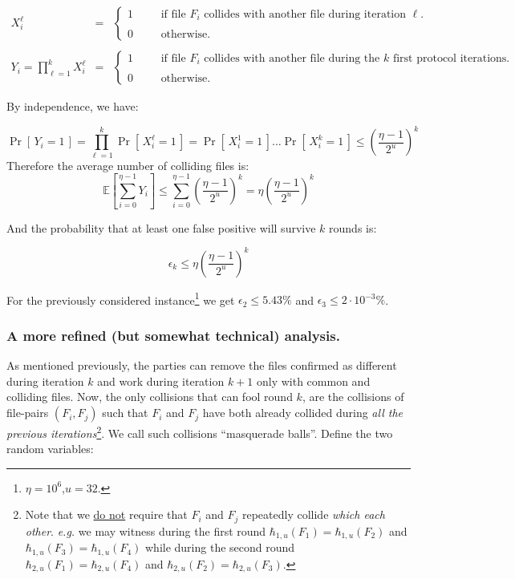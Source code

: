 \documentclass[11pt]{llncs}
\newcommand{\Prob}[1]{{\Pr\left[\,{#1}\,\right]}}
\newcommand{\EE}[1]{{\mathbb{E}\left[{#1}\right]}}
\begin{document}
$$
\begin{array}{rcl}
X^{\ell}_i & = &
\left\{
\begin{array}{lcl}
1 & ~~~~&  \mbox{if file $F_i$ collides with another file during iteration $\ell$.}\\
\\
0 & ~~~~&  \mbox{otherwise.}
\end{array}
\right.\\
\\
Y_i = \prod_{\ell=1}^k X^{\ell}_i & = &
\left\{
\begin{array}{lcl}
1 & ~~~~&  \mbox{if file $F_i$ collides with another file during the $k$ first protocol iterations.}\\
\\
0 & ~~~~&  \mbox{otherwise.}
\end{array}
\right.
\end{array}$$

By independence, we have:

 \[ \Prob{Y_i = 1} = \prod_{\ell=1}^k \Prob{X^{\ell}_i = 1} = \Prob{X^1_i = 1} \dots \Prob{X^k_i = 1} \le \left( \frac{\eta -1}{2^u} \right)^k \]
Therefore the average number of colliding files is:
\[
 \EE{\sum_{i=0}^{\eta-1} Y_i} \le \sum_{i=0}^{\eta-1} \left( \frac{\eta -1}{2^u} \right)^k =  \eta \left(\frac{\eta - 1}{2^u}\right)^k
\]

And the probability that at least one false positive will survive $k$ rounds is:

\[
\epsilon_k \le \eta \left(\frac{\eta - 1}{2^u}\right)^k
\]

For the previously considered instance\footnote{$\eta=10^6$,$u=32$.} we get $\epsilon_2 \le 5.43\%$ and $\epsilon_3 \le 2 \cdot 10^{-3}\%$.

\subsubsection{A more refined (but somewhat technical) analysis.} As mentioned previously, the parties can remove the files confirmed as different during iteration $k$ and work during iteration $k+1$ only with common and colliding files. Now, the only collisions that can fool round $k$, are the collisions of file-pairs $(F_i,F_j)$ such that $F_i$ and $F_j$ have both already collided during {\sl all the previous iterations}\footnote{Note that we \underline{do not} require that $F_i$ and $F_j$ repeatedly collide {\sl which each other}. {\sl e.g.} we may witness during the first round $\hbar_{1,u}(F_1)=\hbar_{1,u}(F_2)$ and $\hbar_{1,u}(F_3)=\hbar_{1,u}(F_4)$ while during the second round $\hbar_{2,u}(F_1)=\hbar_{2,u}(F_4)$ and $\hbar_{2,u}(F_2)=\hbar_{2,u}(F_3)$.}. We call such collisions ``masquerade balls''. Define the two random variables:
\end{document}
